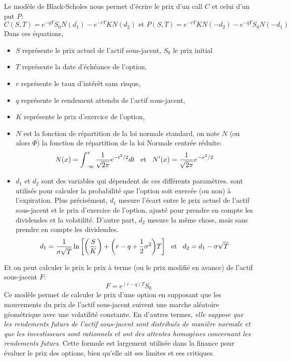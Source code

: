 \documentclass[a4paper]{article}
\begin{document}
 Le modèle de Black-Scholes nous permet d'écrire le prix d'un call $C$ et celui d'un put $P$:
\begin{equation}
    C(S,T) = e^{-qT}S_0 N(d_1) - e^{-rT}K N(d_2) \text{  et  }
    P(S,T) = e^{-rT}K N(- d_2) - e^{-qT}S_0 N(- d_1) 
\end{equation}
Dans ces équations, 
\begin{itemize}
    \item $S$ représente le prix actuel de l'actif sous-jacent, $S_0$ le prix initial
    \item $T$ représente la date d'échéance de l'option,
    \item $r$ représente le taux d'intérêt sans risque,
    \item $q$ représente le rendement attendu de l'actif sous-jacent,
    \item $K$ représente le prix d'exercice de l'option,
    \item $N$ est la fonction de répartition de la loi normale standard,
     on note $N$ (ou alors $\Phi$) la fonction de répartition de la loi Normale centrée réduite:
    \begin{align*}
     N(x) = \int_{-\infty}^{x} \frac{1}{\sqrt{2 \pi}} e^{- t^2 / 2} dt \hspace{3mm}\text{et}\hspace{3mm} N'(x) = \frac{1}{\sqrt{2 \pi}} e^{- x^2 / 2}
    \end{align*}
    \item $d_1$ et $d_2$ sont des variables qui dépendent de ces différents paramètres. sont utilisés pour calculer la probabilité que l'option soit exercée (ou non) à l'expiration. Plus précisément, $d_1$ mesure l'écart entre le prix actuel de l'actif sous-jacent et le prix d'exercice de l'option, ajusté pour prendre en compte les dividendes et la volatilité. D'autre part, $d_2$ mesure la même chose, mais sans prendre en compte les dividendes. 
    \begin{align*}
        d_1 = \frac{1}{\sigma \sqrt{T}} \ln{ \bigg[ \bigg( \frac{S}{K} \bigg) + \bigg( r-q + \frac{1}{2} \sigma^2 \bigg)T }\bigg] \hspace{3mm}\text{et}\hspace{3mm} d_2 = d_1 - \sigma \sqrt{T}
    \end{align*}
\end{itemize}
Et on peut calculer le prix le prix à terme (ou le prix modifié en avance) de l'actif sous-jacent $F$:
\begin{equation}
    F = e^{(r-q)T}S_0 
\end{equation}
 Ce modèle permet de calculer le prix d'une option en supposant que les mouvements du prix de l'actif sous-jacent suivent une marche aléatoire géométrique avec une volatilité constante. En d'autres termes, \textit{elle suppose que les rendements futurs de l'actif sous-jacent sont distribués de manière normale et que les investisseurs sont rationnels et ont des attentes homogènes concernant les rendements futurs}. Cette formule est largement utilisée dans la finance pour évaluer le prix des options, bien qu'elle ait ses limites et ses critiques.
\end{document}
